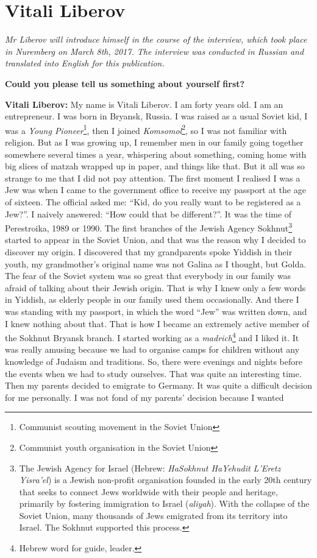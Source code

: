 \section{Vitali Liberov}

\textit{Mr Liberov will introduce himself in the course of the interview, which took place in Nuremberg on March 8th, 2017. The interview was conducted in Russian and translated into English for this publication.}\par
\vspace*{2em}

\textbf{Could you please tell us something about yourself first?} 

\textbf{Vitali Liberov:} My name is Vitali Liberov. I am forty years old. I am an entrepreneur. I was born in Bryansk, Russia. I was raised as a usual Soviet kid, I was a \textit{Young Pioneer}\footnote{Communist scouting movement in the Soviet Union}, then I joined \textit{Komsomol}\footnote{Communist youth organisation in the Soviet Union}, so I was not familiar with religion. But as I was growing up, I remember men in our family going together somewhere several times a year, whispering about something, coming home with big slices of matzah wrapped up in paper, and things like that. But it all was so strange to me that I did not pay attention. The first moment I realised I was a Jew was when I came to the government office to receive my passport at the age of sixteen. The official asked me: “Kid, do you really want to be registered as a Jew?”. I naively answered: “How could that be different?”. It was the time of Perestroika, 1989 or 1990. The first branches of the Jewish Agency Sokhnut\footnote{The Jewish Agency for Israel (Hebrew: \textit{HaSokhnut HaYehudit L'Eretz Yisra'el}) is a Jewish non-profit organisation founded in the early 20th century that seeks to connect Jews worldwide with their people and heritage, primarily by fostering immigration to Israel (\textit{aliyah}). With the collapse of the Soviet Union, many thousands of Jews emigrated from its territory into Israel. The Sokhnut supported this process.} started to appear in the Soviet Union, and that was the reason why I decided to discover my origin. I discovered that my grandparents spoke Yiddish in their youth, my grandmother’s original name was not Galina as I thought, but Golda. The fear of the Soviet system was so great that everybody in our family was afraid of talking about their Jewish origin. That is why I knew only a few words in Yiddish, as elderly people in our family used them occasionally. And there I was standing with my passport, in which the word “Jew” was written down, and I knew nothing about that. That is how I became an extremely active member of the Sokhnut Bryansk branch. I started working as a \textit{madrich}\footnote{Hebrew word for guide, leader.} and I liked it.  It was really amusing because we had to organise camps for children without any knowledge of Judaism and traditions. So, there were evenings and nights before the events when we had to study ourselves. That was quite an interesting time. Then my parents decided to emigrate to Germany. It was quite a difficult decision for me personally. I was not fond of my parents’ decision because I wanted 